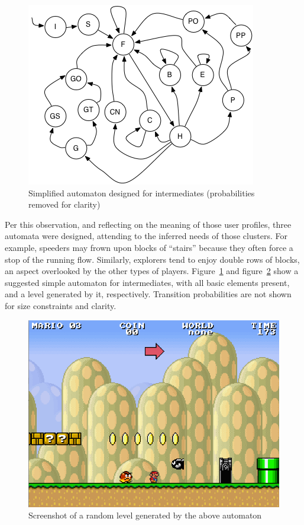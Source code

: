 \documentclass[conference]{IEEEtran}
\begin{document}
\begin{figure}[htp]
\centerline{\includegraphics[width=0.75\columnwidth]{automaton.png}}
\caption{Simplified automaton designed for intermediates (probabilities removed for clarity)}
\label{automaton}
\end{figure}

Per this observation, and reflecting on the meaning of those user profiles, three automata were designed, attending to the inferred needs of those clusters. For example, speeders may frown upon blocks of ``stairs'' because they often force a stop of the running flow. Similarly, explorers tend to enjoy double rows of blocks, an aspect overlooked by the other types of players. Figure~\ref{automaton} and figure~\ref{screenshot} show a suggested simple automaton for intermediates, with all basic elements present, and a level generated by it, respectively. Transition probabilities are not shown for size constraints and clarity.

\begin{figure}[htp]
\centerline{\includegraphics[width=0.75\columnwidth]{screenshot.png}}
\caption{Screenshot of a random level generated by the above automaton}
\label{screenshot}
\end{figure}
\end{document}
